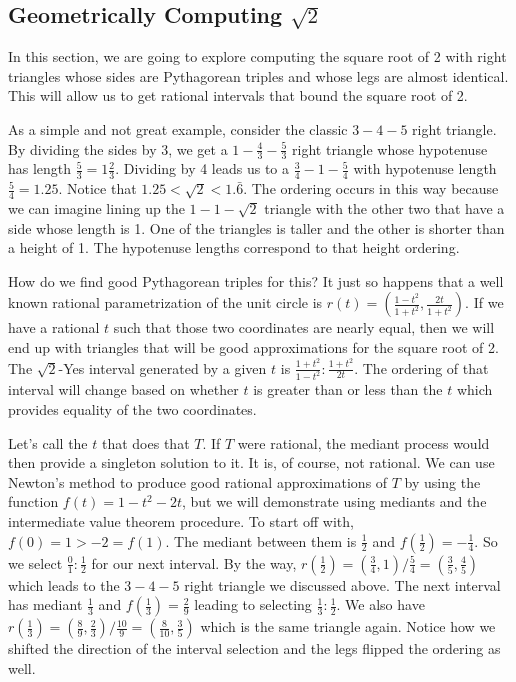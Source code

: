 \documentclass[12pt]{article}
\begin{document}
\subsection{Geometrically Computing \texorpdfstring{$\sqrt{2}$}{sqrt2}}

In this section, we are going to explore computing the square root of 2 with right triangles whose sides are Pythagorean triples and whose legs are almost identical. This will allow us to get rational intervals that bound the square root of 2. 

As a simple and not great example, consider the classic $3-4-5$ right triangle. By dividing the sides by 3, we get a $1-\frac{4}{3}-\frac{5}{3}$ right triangle whose hypotenuse has length $\frac{5}{3} = 1 \frac{2}{3}$. Dividing by 4 leads us to a $\frac{3}{4}-1-\frac{5}{4}$ with hypotenuse  length $\frac{5}{4} = 1.25$. Notice that $1.25 < \sqrt{2} < 1.\bar{6}$.  The ordering occurs in this way because we can imagine lining up the $1-1-\sqrt{2}$ triangle with the other two that have a side whose length is 1. One of the triangles is taller and the other is shorter than a height of 1. The hypotenuse lengths correspond to that height ordering. 

How do we find good Pythagorean triples for this? It just so happens that a well known rational parametrization of the unit circle is  $r(t) = (\frac{1-t^2}{1+t^2}, \frac{2t}{1+t^2})$.  If we have a rational $t$ such that those two coordinates are nearly equal, then we will end up with triangles that will be good approximations for the square root of 2. The $\sqrt{2}$-Yes interval generated by a given $t$ is $\frac{1+t^2}{1-t^2}:\frac{1+t^2}{2t}$. The ordering of that interval will change based on whether $t$ is greater than or less than the $t$ which provides equality of the two coordinates. 

Let's call the $t$ that does that $T$. If $T$ were rational, the mediant process would then provide a singleton solution to it. It is, of course, not rational. We can use Newton's method to produce good rational approximations of $T$ by using the function $f(t) = 1-t^2 - 2t$, but we will demonstrate using mediants and the intermediate value theorem procedure. To start off with, $f(0) = 1 > -2 = f(1)$. The mediant between them is $\frac{1}{2}$ and $f(\frac{1}{2}) = -\frac{1}{4}$. So we select $\frac{0}{1}:\frac{1}{2}$ for our next interval. By the way, $r(\frac{1}{2}) = (\frac{3}{4}, 1) / \frac{5}{4} = (\frac{3}{5}, \frac{4}{5})$ which leads to the $3-4-5$ right triangle we discussed above.  The next interval has mediant $\frac{1}{3}$ and $f(\frac{1}{3}) = \frac{2}{9}$ leading to selecting $\frac{1}{3}:\frac{1}{2}$. We also have $r(\frac{1}{3}) = ( \frac{8}{9}, \frac{2}{3}) / \frac{10}{9} = (\frac{8}{10}, \frac{3}{5})$ which is the same triangle again. Notice how we shifted the direction of the interval selection and the legs flipped the ordering as well.
\end{document}
